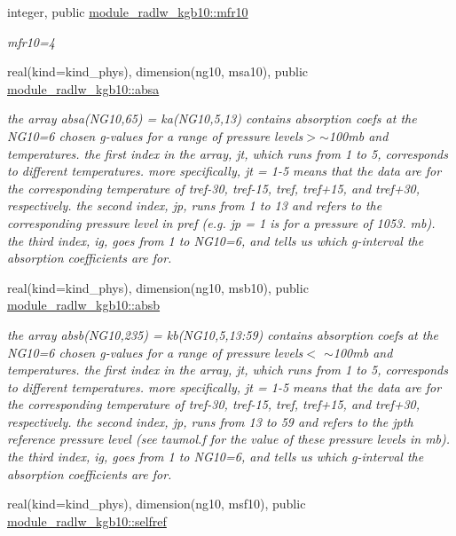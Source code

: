 \begin{Indent}
\begin{DoxyCompactItemize}
integer, public \hyperlink{group__module__radlw__kgbnn_ga0f3944c4b86044e0c5db3dc351226c88}{module\+\_\+radlw\+\_\+kgb10\+::mfr10}
\begin{DoxyCompactList}\small\item\em mfr10=4 \end{DoxyCompactList}\item 
real(kind=kind\+\_\+phys), dimension(ng10, msa10), public \hyperlink{group__module__radlw__kgbnn_ga14f18538f77c1a3d651e36acf90baa19}{module\+\_\+radlw\+\_\+kgb10\+::absa}
\begin{DoxyCompactList}\small\item\em the array absa(\+N\+G10,65) = ka(\+N\+G10,5,13) contains absorption coefs at the N\+G10=6 chosen g-\/values for a range of pressure levels$>$$\sim$100mb and temperatures. the first index in the array, jt, which runs from 1 to 5, corresponds to different temperatures. more specifically, jt = 1-\/5 means that the data are for the corresponding temperature of tref-\/30, tref-\/15, tref, tref+15, and tref+30, respectively. the second index, jp, runs from 1 to 13 and refers to the corresponding pressure level in pref (e.\+g. jp = 1 is for a pressure of 1053. mb). the third index, ig, goes from 1 to N\+G10=6, and tells us which g-\/interval the absorption coefficients are for. \end{DoxyCompactList}\item 
real(kind=kind\+\_\+phys), dimension(ng10, msb10), public \hyperlink{group__module__radlw__kgbnn_gaf1e2252355a3002080be21ce37d45c3a}{module\+\_\+radlw\+\_\+kgb10\+::absb}
\begin{DoxyCompactList}\small\item\em the array absb(\+N\+G10,235) = kb(\+N\+G10,5,13\+:59) contains absorption coefs at the N\+G10=6 chosen g-\/values for a range of pressure levels$<$ $\sim$100mb and temperatures. the first index in the array, jt, which runs from 1 to 5, corresponds to different temperatures. more specifically, jt = 1-\/5 means that the data are for the corresponding temperature of tref-\/30, tref-\/15, tref, tref+15, and tref+30, respectively. the second index, jp, runs from 13 to 59 and refers to the jpth reference pressure level (see taumol.\+f for the value of these pressure levels in mb). the third index, ig, goes from 1 to N\+G10=6, and tells us which g-\/interval the absorption coefficients are for. \end{DoxyCompactList}\item 
real(kind=kind\+\_\+phys), dimension(ng10, msf10), public \hyperlink{group__module__radlw__kgbnn_ga48247dea283a611ebe57dd1c164dda69}{module\+\_\+radlw\+\_\+kgb10\+::selfref}

\end{DoxyCompactItemize}
\end{Indent}
